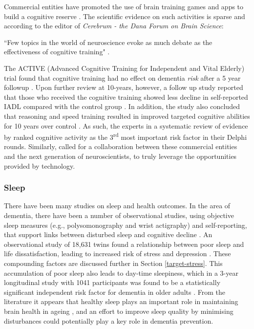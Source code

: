 Commercial entities have promoted the use of brain training games and apps to build a cognitive reserve \cite{Worland}. The scientific evidence on such activities is sparse and according to the editor of \textit{Cerebrum - the Dana Forum on Brain Science}:
\begin{displayquote}
``Few topics in the world of neuroscience evoke as much debate as the effectiveness of cognitive training" \cite{Boot2014}.
\end{displayquote}
The ACTIVE (Advanced Cognitive Training for Independent and Vital Elderly) trial found that cognitive training had no effect on dementia \textit{risk} after a 5 year followup \cite{Unverzagt2012}. Upon further review at 10-years, however, a follow up study reported that those who received the cognitive training showed less decline in self-reported IADL compared with the control group \cite{Rebok2014}. In addition, the study also concluded that reasoning and speed training resulted in improved targeted cognitive abilities for 10 years over control \cite{Rebok2014}.
As such, the experts in a systematic review of evidence by \citeauthor{Deckers2015} ranked cognitive activity as the 3\textsuperscript{rd} most important risk factor in their Delphi rounds. Similarly, \cite{Bavelier2013} called for a collaboration between these commercial entities and the next generation of neuroscientists, to truly leverage the opportunities provided by technology.

\subsubsection{Sleep}
There have been many studies on sleep and health outcomes. In the area of dementia, there have been a number of observational studies, using objective sleep measures (e.g., polysomonography and wrist actigraphy) and self-reporting, that support links between disturbed sleep and cognitive decline \cite{Spira2014}. An observational study of 18,631 twins found a relationship between poor sleep and life dissatisfaction, leading to increased risk of stress and depression \cite{Paunio2009}. These compounding factors are discussed further in Section \ref{target-stress}. This accumulation of poor sleep also leads to day-time sleepiness, which in a 3-year longitudinal study with 1041 participants was found to be a statistically significant independent risk factor for dementia in older adults \cite{Tsapanou2015}.
From the literature it appears that healthy sleep plays an important role in maintaining brain health in ageing \cite{Spira2014}, and an effort to improve sleep quality by minimising disturbances could potentially play a key role in dementia prevention.

